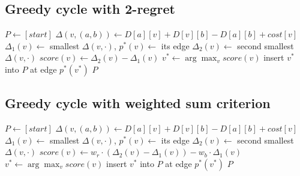 \documentclass[11pt,a4paper]{article}
\begin{document}
\subsection*{Greedy cycle with 2-regret}
\begin{algorithm}[H]
\caption{Greedy cycle with 2-regret}
\begin{algorithmic}[1]
  \State $P \gets [\mathit{start}]$
        \State $\Delta(v, (a, b)) \gets D[a][v] + D[v][b] - D[a][b] + \mathit{cost}[v]$
      \EndFor
      \State $\Delta_1(v) \gets$ smallest $\Delta(v, \cdot)$, $p^*(v) \gets$ its edge
      \State $\Delta_2(v) \gets$ second smallest $\Delta(v, \cdot)$ 
      \State $\mathit{score}(v) \gets \Delta_2(v) - \Delta_1(v)$
    \EndFor
    \State $v^* \gets \arg\max_v \mathit{score}(v)$ 
    \State insert $v^*$ into $P$ at edge $p^*(v^*)$
  \EndWhile
  \State \Return $P$
\EndFunction
\end{algorithmic}
\end{algorithm}

\subsection*{Greedy cycle with weighted sum criterion}
\begin{algorithm}[H]
\caption{Greedy cycle with 2-regret + best change}
\begin{algorithmic}[1]
  \State $P \gets [\mathit{start}]$
        \State $\Delta(v, (a, b)) \gets D[a][v] + D[v][b] - D[a][b] + \mathit{cost}[v]$
      \EndFor
      \State $\Delta_1(v) \gets$ smallest $\Delta(v, \cdot)$, $p^*(v) \gets$ its edge
      \State $\Delta_2(v) \gets$ second smallest $\Delta(v, \cdot)$ 
      \State $\mathit{score}(v) \gets w_r \cdot (\Delta_2(v) - \Delta_1(v)) - w_b \cdot \Delta_1(v)$
    \EndFor
    \State $v^* \gets \arg\max_v \mathit{score}(v)$ 
    \State insert $v^*$ into $P$ at edge $p^*(v^*)$
  \EndWhile
  \State \Return $P$
\EndFunction
\end{algorithmic}
\end{algorithm}
\end{document}
